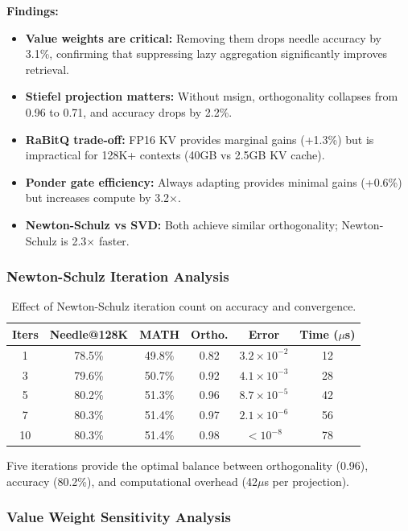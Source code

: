 \documentclass[twocolumn]{article}
\begin{document}
\textbf{Findings:}
\begin{itemize}
    \item \textbf{Value weights are critical:} Removing them drops needle accuracy by 3.1\%, confirming that suppressing lazy aggregation significantly improves retrieval.
    \item \textbf{Stiefel projection matters:} Without msign, orthogonality collapses from 0.96 to 0.71, and accuracy drops by 2.2\%.
    \item \textbf{RaBitQ trade-off:} FP16 KV provides marginal gains (+1.3\%) but is impractical for 128K+ contexts (40GB vs 2.5GB KV cache).
    \item \textbf{Ponder gate efficiency:} Always adapting provides minimal gains (+0.6\%) but increases compute by 3.2$\times$.
    \item \textbf{Newton-Schulz vs SVD:} Both achieve similar orthogonality; Newton-Schulz is 2.3$\times$ faster.
\end{itemize}

\subsubsection{Newton-Schulz Iteration Analysis}

\begin{table}[htbp]
\centering
\caption{Effect of Newton-Schulz iteration count on accuracy and convergence.}
\label{tab:newton-schulz}
\begin{tabular}{cccccc}
\toprule
\textbf{Iters} & \textbf{Needle@128K} & \textbf{MATH} & \textbf{Ortho.} & \textbf{Error} & \textbf{Time ($\mu$s)} \\
\midrule
1 & 78.5\% & 49.8\% & 0.82 & $3.2 \times 10^{-2}$ & 12 \\
3 & 79.6\% & 50.7\% & 0.92 & $4.1 \times 10^{-3}$ & 28 \\
5 & 80.2\% & 51.3\% & 0.96 & $8.7 \times 10^{-5}$ & 42 \\
7 & 80.3\% & 51.4\% & 0.97 & $2.1 \times 10^{-6}$ & 56 \\
10 & 80.3\% & 51.4\% & 0.98 & $< 10^{-8}$ & 78 \\
\bottomrule
\end{tabular}
\end{table}

Five iterations provide the optimal balance between orthogonality (0.96), accuracy (80.2\%), and computational overhead (42$\mu$s per projection).

\subsubsection{Value Weight Sensitivity Analysis}
\end{document}
